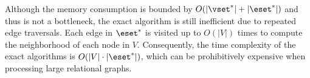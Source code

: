 Although the memory consumption is bounded by $O(|\vset^*|+|\eset^*|)$ and thus is not a bottleneck, the exact algorithm is still inefficient due to repeated edge traversals.
Each edge in $\eset^*$ is visited up to $O(|V|)$ times to compute the neighborhood of each node in $V$.
Consequently, the time complexity of the exact algorithms is $O(|V| \cdot |\eset^*|)$, which can be prohibitively expensive when processing large relational graphs.
